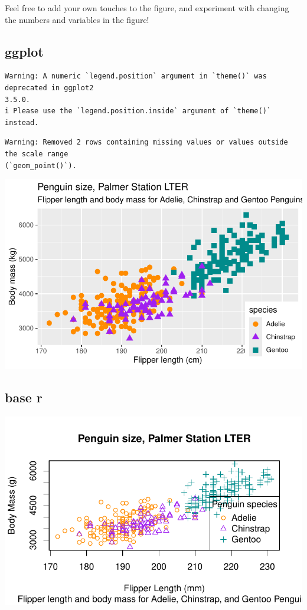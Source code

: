 \documentclass[
  letterpaper,
  DIV=11,
  numbers=noendperiod]{scrreprt}
\begin{document}
Feel free to add your own touches to the figure, and experiment with
changing the numbers and variables in the figure!

\subsection{ggplot}

\begin{verbatim}
Warning: A numeric `legend.position` argument in `theme()` was deprecated in ggplot2
3.5.0.
i Please use the `legend.position.inside` argument of `theme()` instead.
\end{verbatim}

\begin{verbatim}
Warning: Removed 2 rows containing missing values or values outside the scale range
(`geom_point()`).
\end{verbatim}

\includegraphics{scripts/02_dataViz/class4_files/figure-pdf/unnamed-chunk-2-1.pdf}

\subsection{base r}

\includegraphics{scripts/02_dataViz/class4_files/figure-pdf/unnamed-chunk-3-1.pdf}
\end{document}
